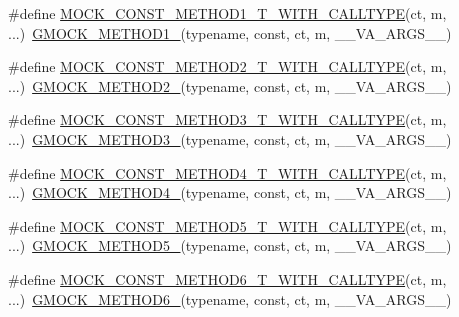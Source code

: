 \begin{DoxyCompactItemize}
\item 
\#define \mbox{\hyperlink{gmock-generated-function-mockers_8h_a73aa181fb48e360fd18f1c2b7d9073b0}{M\+O\+C\+K\+\_\+\+C\+O\+N\+S\+T\+\_\+\+M\+E\+T\+H\+O\+D1\+\_\+\+T\+\_\+\+W\+I\+T\+H\+\_\+\+C\+A\+L\+L\+T\+Y\+PE}}(ct,  m, ...)~\mbox{\hyperlink{gmock-generated-function-mockers_8h_a1bc0012d62440dda77208dabdf4925c9}{G\+M\+O\+C\+K\+\_\+\+M\+E\+T\+H\+O\+D1\+\_\+}}(typename, const, ct, m, \+\_\+\+\_\+\+V\+A\+\_\+\+A\+R\+G\+S\+\_\+\+\_\+)
\item 
\#define \mbox{\hyperlink{gmock-generated-function-mockers_8h_a74512829feca879a8e11731f0442d7b7}{M\+O\+C\+K\+\_\+\+C\+O\+N\+S\+T\+\_\+\+M\+E\+T\+H\+O\+D2\+\_\+\+T\+\_\+\+W\+I\+T\+H\+\_\+\+C\+A\+L\+L\+T\+Y\+PE}}(ct,  m, ...)~\mbox{\hyperlink{gmock-generated-function-mockers_8h_a885295ca6bebb15efb3fc786218c5d47}{G\+M\+O\+C\+K\+\_\+\+M\+E\+T\+H\+O\+D2\+\_\+}}(typename, const, ct, m, \+\_\+\+\_\+\+V\+A\+\_\+\+A\+R\+G\+S\+\_\+\+\_\+)
\item 
\#define \mbox{\hyperlink{gmock-generated-function-mockers_8h_ac19708f4d74bb11d9aeecb7c5b74dec8}{M\+O\+C\+K\+\_\+\+C\+O\+N\+S\+T\+\_\+\+M\+E\+T\+H\+O\+D3\+\_\+\+T\+\_\+\+W\+I\+T\+H\+\_\+\+C\+A\+L\+L\+T\+Y\+PE}}(ct,  m, ...)~\mbox{\hyperlink{gmock-generated-function-mockers_8h_af7c77ba511c631de02bb8c45a6ed3045}{G\+M\+O\+C\+K\+\_\+\+M\+E\+T\+H\+O\+D3\+\_\+}}(typename, const, ct, m, \+\_\+\+\_\+\+V\+A\+\_\+\+A\+R\+G\+S\+\_\+\+\_\+)
\item 
\#define \mbox{\hyperlink{gmock-generated-function-mockers_8h_acd1c5b5fca7c75ef5ed812f1e495a3f7}{M\+O\+C\+K\+\_\+\+C\+O\+N\+S\+T\+\_\+\+M\+E\+T\+H\+O\+D4\+\_\+\+T\+\_\+\+W\+I\+T\+H\+\_\+\+C\+A\+L\+L\+T\+Y\+PE}}(ct,  m, ...)~\mbox{\hyperlink{gmock-generated-function-mockers_8h_ab6430f2cfad9de4aca5258ea559294bb}{G\+M\+O\+C\+K\+\_\+\+M\+E\+T\+H\+O\+D4\+\_\+}}(typename, const, ct, m, \+\_\+\+\_\+\+V\+A\+\_\+\+A\+R\+G\+S\+\_\+\+\_\+)
\item 
\#define \mbox{\hyperlink{gmock-generated-function-mockers_8h_ae1e95e9eb000b737025cb74da20398ac}{M\+O\+C\+K\+\_\+\+C\+O\+N\+S\+T\+\_\+\+M\+E\+T\+H\+O\+D5\+\_\+\+T\+\_\+\+W\+I\+T\+H\+\_\+\+C\+A\+L\+L\+T\+Y\+PE}}(ct,  m, ...)~\mbox{\hyperlink{gmock-generated-function-mockers_8h_a9e3ecd392499ab19a4a6d3adcabf56f6}{G\+M\+O\+C\+K\+\_\+\+M\+E\+T\+H\+O\+D5\+\_\+}}(typename, const, ct, m, \+\_\+\+\_\+\+V\+A\+\_\+\+A\+R\+G\+S\+\_\+\+\_\+)
\item 
\#define \mbox{\hyperlink{gmock-generated-function-mockers_8h_a3acffd86eecfbcfe829231930406610b}{M\+O\+C\+K\+\_\+\+C\+O\+N\+S\+T\+\_\+\+M\+E\+T\+H\+O\+D6\+\_\+\+T\+\_\+\+W\+I\+T\+H\+\_\+\+C\+A\+L\+L\+T\+Y\+PE}}(ct,  m, ...)~\mbox{\hyperlink{gmock-generated-function-mockers_8h_ad0ca7f6973a076d0af4c953f8ed91842}{G\+M\+O\+C\+K\+\_\+\+M\+E\+T\+H\+O\+D6\+\_\+}}(typename, const, ct, m, \+\_\+\+\_\+\+V\+A\+\_\+\+A\+R\+G\+S\+\_\+\+\_\+)

\end{DoxyCompactItemize}

